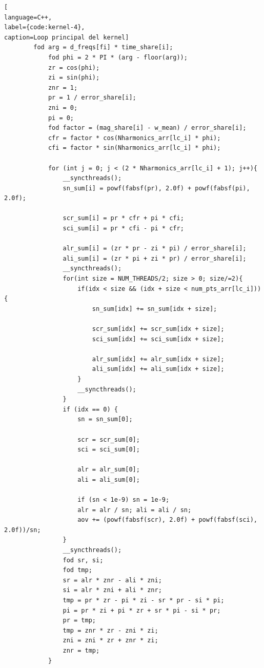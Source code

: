 \begin{lstlisting}[
language=C++,
label={code:kernel-4},
caption=Loop principal del kernel]
        fod arg = d_freqs[fi] * time_share[i];
            fod phi = 2 * PI * (arg - floor(arg));
            zr = cos(phi);
            zi = sin(phi);
            znr = 1;
            pr = 1 / error_share[i];
            zni = 0;
            pi = 0;
            fod factor = (mag_share[i] - w_mean) / error_share[i];
            cfr = factor * cos(Nharmonics_arr[lc_i] * phi);
            cfi = factor * sin(Nharmonics_arr[lc_i] * phi);

            for (int j = 0; j < (2 * Nharmonics_arr[lc_i] + 1); j++){
                __syncthreads();
                sn_sum[i] = powf(fabsf(pr), 2.0f) + powf(fabsf(pi), 2.0f);

                scr_sum[i] = pr * cfr + pi * cfi;
                sci_sum[i] = pr * cfi - pi * cfr;

                alr_sum[i] = (zr * pr - zi * pi) / error_share[i];
                ali_sum[i] = (zr * pi + zi * pr) / error_share[i];
                __syncthreads();
                for(int size = NUM_THREADS/2; size > 0; size/=2){
                    if(idx < size && (idx + size < num_pts_arr[lc_i])){
                        sn_sum[idx] += sn_sum[idx + size];

                        scr_sum[idx] += scr_sum[idx + size];
                        sci_sum[idx] += sci_sum[idx + size];

                        alr_sum[idx] += alr_sum[idx + size];
                        ali_sum[idx] += ali_sum[idx + size];
                    }
                    __syncthreads();
                }
                if (idx == 0) {
                    sn = sn_sum[0];

                    scr = scr_sum[0];
                    sci = sci_sum[0];

                    alr = alr_sum[0];
                    ali = ali_sum[0];

                    if (sn < 1e-9) sn = 1e-9;
                    alr = alr / sn; ali = ali / sn;
                    aov += (powf(fabsf(scr), 2.0f) + powf(fabsf(sci), 2.0f))/sn;
                }
                __syncthreads();
                fod sr, si;
                fod tmp;
                sr = alr * znr - ali * zni;
                si = alr * zni + ali * znr;
                tmp = pr * zr - pi * zi - sr * pr - si * pi;
                pi = pr * zi + pi * zr + sr * pi - si * pr;
                pr = tmp;
                tmp = znr * zr - zni * zi;
                zni = zni * zr + znr * zi;
                znr = tmp;
            }
\end{lstlisting}
